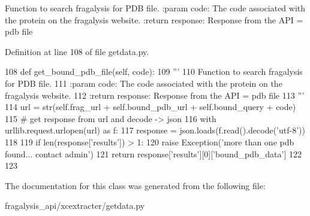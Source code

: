 \begin{DoxyVerb}Function to search fragalysis for PDB file.
:param code: The code associated with the protein on the fragalysis website.
:return response: Response from the API = pdb file
\end{DoxyVerb}
 

Definition at line 108 of file getdata.\+py.


\begin{DoxyCode}
108     \textcolor{keyword}{def }get\_bound\_pdb\_file(self, code):
109         \textcolor{stringliteral}{'''}
110 \textcolor{stringliteral}{        Function to search fragalysis for PDB file.}
111 \textcolor{stringliteral}{        :param code: The code associated with the protein on the fragalysis website.}
112 \textcolor{stringliteral}{        :return response: Response from the API = pdb file}
113 \textcolor{stringliteral}{        '''}
114         url = str(self.frag\_url + self.bound\_pdb\_url + self.bound\_query + code)
115         \textcolor{comment}{# get response from url and decode -> json}
116         with urllib.request.urlopen(url) \textcolor{keyword}{as} f:
117             response = json.loads(f.read().decode(\textcolor{stringliteral}{'utf-8'}))
118 
119         \textcolor{keywordflow}{if} len(response[\textcolor{stringliteral}{'results'}]) > 1:
120             \textcolor{keywordflow}{raise} Exception(\textcolor{stringliteral}{'more than one pdb found... contact admin'})
121         \textcolor{keywordflow}{return} response[\textcolor{stringliteral}{'results'}][0][\textcolor{stringliteral}{'bound\_pdb\_data'}]
122 
123 
\end{DoxyCode}


The documentation for this class was generated from the following file\+:\begin{DoxyCompactItemize}
\item 
fragalysis\+\_\+api/xcextracter/getdata.\+py\end{DoxyCompactItemize}
